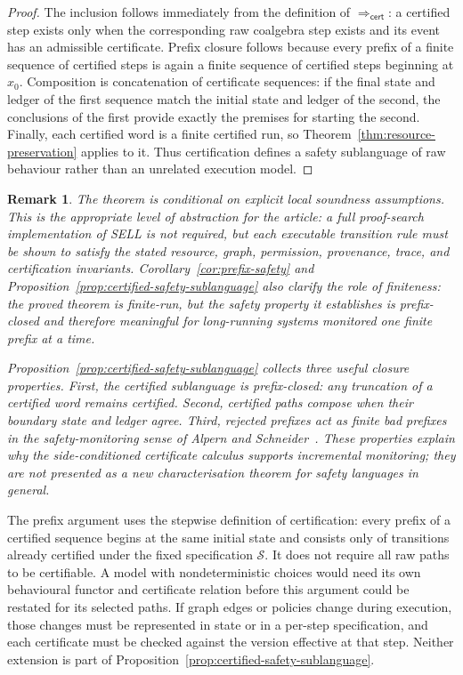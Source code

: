 \documentclass[a4paper,fleqn]{cas-sc}
\newtheorem{remark}{Remark}
\newcommand{\cert}{\mathsf{cert}}
\begin{document}
\begin{proof}
The inclusion follows immediately from the definition of \(\Longrightarrow_{\cert}\): a certified step exists only when the corresponding raw coalgebra step exists and its event has an admissible certificate. Prefix closure follows because every prefix of a finite sequence of certified steps is again a finite sequence of certified steps beginning at \(x_0\). Composition is concatenation of certificate sequences: if the final state and ledger of the first sequence match the initial state and ledger of the second, the conclusions of the first provide exactly the premises for starting the second. Finally, each certified word is a finite certified run, so Theorem~\ref{thm:resource-preservation} applies to it. Thus certification defines a safety sublanguage of raw behaviour rather than an unrelated execution model.
\end{proof}

\begin{remark}
The theorem is conditional on explicit local soundness assumptions. This is the appropriate level of abstraction for the article: a full proof-search implementation of SELL is not required, but each executable transition rule must be shown to satisfy the stated resource, graph, permission, provenance, trace, and certification invariants. Corollary~\ref{cor:prefix-safety} and Proposition~\ref{prop:certified-safety-sublanguage} also clarify the role of finiteness: the proved theorem is finite-run, but the safety property it establishes is prefix-closed and therefore meaningful for long-running systems monitored one finite prefix at a time.

Proposition~\ref{prop:certified-safety-sublanguage} collects three useful closure properties. First, the certified sublanguage is \emph{prefix-closed}: any truncation of a certified word remains certified. Second, certified paths \emph{compose} when their boundary state and ledger agree. Third, rejected prefixes act as finite bad prefixes in the safety-monitoring sense of Alpern and Schneider~\cite{alpern1987safety}. These properties explain why the side-conditioned certificate calculus supports incremental monitoring; they are not presented as a new characterisation theorem for safety languages in general.
\end{remark}

The prefix argument uses the stepwise definition of certification: every
prefix of a certified sequence begins at the same initial state and consists
only of transitions already certified under the fixed specification
\(\mathcal S\). It does not require all raw paths to be certifiable. A model
with nondeterministic choices would need its own behavioural functor and
certificate relation before this argument could be restated for its selected
paths. If graph edges or policies change during execution, those changes must
be represented in state or in a per-step specification, and each certificate
must be checked against the version effective at that step. Neither extension
is part of Proposition~\ref{prop:certified-safety-sublanguage}.
\end{document}
